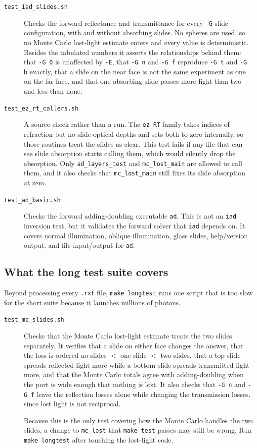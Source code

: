 \documentclass{article}
\newcommand\iadprog{\texttt{iad}}
\begin{document}
\begin{description}
\item[\texttt{test\_iad\_slides.sh}]
Checks the forward reflectance and transmittance for every \texttt{-G} slide
configuration, with and without absorbing slides.  No spheres are used, so no
Monte Carlo lost-light estimate enters and every value is deterministic.
Besides the tabulated numbers it asserts the relationships behind them: that
\texttt{-G 0} is unaffected by \texttt{-E}, that \texttt{-G n} and \texttt{-G f}
reproduce \texttt{-G t} and \texttt{-G b} exactly, that a slide on the near face
is not the same experiment as one on the far face, and that one absorbing slide
passes more light than two and less than none.

\item[\texttt{test\_ez\_rt\_callers.sh}]
A source check rather than a run.  The \texttt{ez\_RT} family takes indices of
refraction but no slide optical depths and sets both to zero internally, so
those routines treat the slides as clear.  This test fails if any file that can
see slide absorption starts calling them, which would silently drop the
absorption.  Only \texttt{ad\_layers\_test} and \texttt{mc\_lost\_main} are
allowed to call them, and it also checks that \texttt{mc\_lost\_main} still
fixes its slide absorption at zero.

\item[\texttt{test\_ad\_basic.sh}]
Checks the forward adding-doubling executable \texttt{ad}.  This is not an
\iadprog{} inversion test, but it validates the forward solver that
\iadprog{} depends on.  It covers normal illumination, oblique illumination,
glass slides, help/version output, and file input/output for \texttt{ad}.
\end{description}

\subsection{What the long test suite covers}

Beyond processing every \texttt{.rxt} file, \texttt{make longtest} runs one
script that is too slow for the short suite because it launches millions of
photons.

\begin{description}
\item[\texttt{test\_mc\_slides.sh}]
Checks that the Monte Carlo lost-light estimate treats the two slides
separately.  It verifies that a slide on either face changes the answer, that
the loss is ordered no slides $<$ one slide $<$ two slides, that a top slide
spreads reflected light more while a bottom slide spreads transmitted light
more, and that the Monte Carlo totals agree with adding-doubling when the port
is wide enough that nothing is lost.  It also checks that \texttt{-G n} and
\texttt{-G f} leave the reflection losses alone while changing the transmission
losses, since lost light is not reciprocal.

Because this is the only test covering how the Monte Carlo handles the two
slides, a change to \texttt{mc\_lost} that \texttt{make test} passes may still
be wrong.  Run \texttt{make longtest} after touching the lost-light code.
\end{description}
\end{document}
